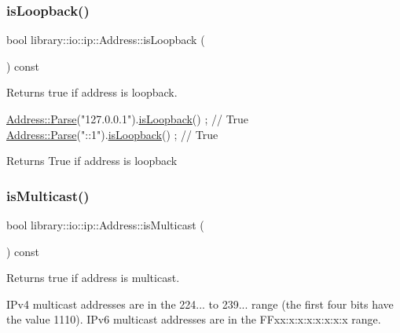 \subsubsection{\texorpdfstring{is\+Loopback()}{isLoopback()}}
{\footnotesize\ttfamily bool library\+::io\+::ip\+::\+Address\+::is\+Loopback (\begin{DoxyParamCaption}{ }\end{DoxyParamCaption}) const}



Returns true if address is loopback. 


\begin{DoxyCode}
\hyperlink{classlibrary_1_1io_1_1ip_1_1_address_af8ab0e365de3c00109b456ee94e2590b}{Address::Parse}(\textcolor{stringliteral}{"127.0.0.1"}).\hyperlink{classlibrary_1_1io_1_1ip_1_1_address_abd441207de67b876bafecca7ac1e70b1}{isLoopback}() ; \textcolor{comment}{// True}
\hyperlink{classlibrary_1_1io_1_1ip_1_1_address_af8ab0e365de3c00109b456ee94e2590b}{Address::Parse}(\textcolor{stringliteral}{"::1"}).\hyperlink{classlibrary_1_1io_1_1ip_1_1_address_abd441207de67b876bafecca7ac1e70b1}{isLoopback}() ; \textcolor{comment}{// True}
\end{DoxyCode}


\begin{DoxyReturn}{Returns}
True if address is loopback 
\end{DoxyReturn}
\mbox{\label{classlibrary_1_1io_1_1ip_1_1_address_a4571470091447ac28652f072708a2cea}} 
\subsubsection{\texorpdfstring{is\+Multicast()}{isMulticast()}}
{\footnotesize\ttfamily bool library\+::io\+::ip\+::\+Address\+::is\+Multicast (\begin{DoxyParamCaption}{ }\end{DoxyParamCaption}) const}



Returns true if address is multicast. 

I\+Pv4 multicast addresses are in the 224... to 239... range (the first four bits have the value 1110). I\+Pv6 multicast addresses are in the F\+Fxx\+:x\+:x\+:x\+:x\+:x\+:x\+:x range.


